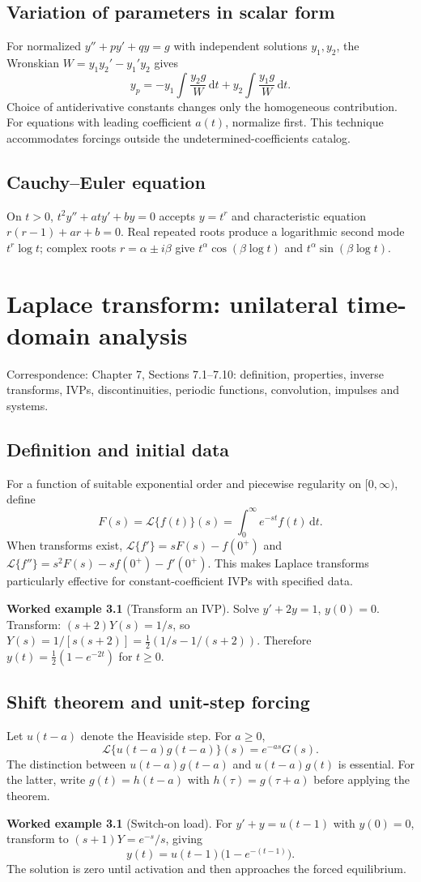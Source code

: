 \documentclass[11pt,letterpaper,oneside]{report}
\theoremstyle{definition}\newtheorem{definition}[theorem]{Definition}
\newtheorem{example}[theorem]{Worked example}
\theoremstyle{remark}\newtheorem{remark}[theorem]{Remark}
\newcommand{\dd}{\,\mathrm{d}}
\newcommand{\lap}{\mathcal{L}}
\begin{document}
\section{Variation of parameters in scalar form}
For normalized $y''+py'+qy=g$ with independent solutions $y_1,y_2$, the Wronskian $W=y_1y_2'-y_1'y_2$ gives
\[y_p=-y_1\int\frac{y_2g}{W}\dd t+y_2\int\frac{y_1g}{W}\dd t.\]
Choice of antiderivative constants changes only the homogeneous contribution. For equations with leading coefficient $a(t)$, normalize first. This technique accommodates forcings outside the undetermined-coefficients catalog.
\section{Cauchy--Euler equation}
On $t>0$, $t^2y''+at y'+by=0$ accepts $y=t^r$ and characteristic equation $r(r-1)+ar+b=0$. Real repeated roots produce a logarithmic second mode $t^r\log t$; complex roots $r=\alpha\pm i\beta$ give $t^\alpha\cos(\beta\log t)$ and $t^\alpha\sin(\beta\log t)$.
\chapter{Laplace transform: unilateral time-domain analysis}
\begin{bookground}Correspondence: Chapter 7, Sections 7.1--7.10: definition, properties, inverse transforms, IVPs, discontinuities, periodic functions, convolution, impulses and systems.\end{bookground}
\section{Definition and initial data}
For a function of suitable exponential order and piecewise regularity on $[0,\infty)$, define
\[F(s)=\lap\{f(t)\}(s)=\int_0^\infty e^{-st}f(t)\dd t.\]
When transforms exist, $\lap\{f'\}=sF(s)-f(0^+)$ and $\lap\{f''\}=s^2F(s)-sf(0^+)-f'(0^+)$. This makes Laplace transforms particularly effective for constant-coefficient IVPs with specified data.
\begin{example}[Transform an IVP]
Solve $y'+2y=1$, $y(0)=0$. Transform: $(s+2)Y(s)=1/s$, so $Y(s)=1/[s(s+2)]=\tfrac12(1/s-1/(s+2))$. Therefore $y(t)=\tfrac12(1-e^{-2t})$ for $t\ge0$.
\end{example}
\section{Shift theorem and unit-step forcing}
Let $u(t-a)$ denote the Heaviside step. For $a\ge0$,
\[\lap\{u(t-a)g(t-a)\}(s)=e^{-as}G(s).\]
The distinction between $u(t-a)g(t-a)$ and $u(t-a)g(t)$ is essential. For the latter, write $g(t)=h(t-a)$ with $h(\tau)=g(\tau+a)$ before applying the theorem.
\begin{example}[Switch-on load]
For $y'+y=u(t-1)$ with $y(0)=0$, transform to $(s+1)Y=e^{-s}/s$, giving
\[y(t)=u(t-1)\bigl(1-e^{-(t-1)}\bigr).\]
The solution is zero until activation and then approaches the forced equilibrium.
\end{example}
\end{document}
